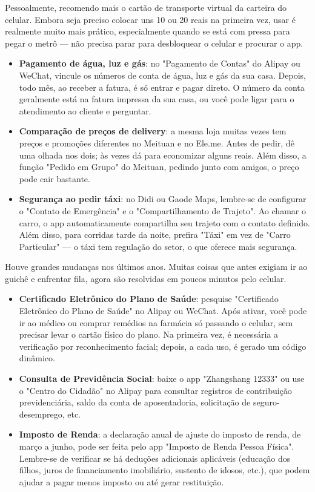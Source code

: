 Pessoalmente, recomendo mais o cartão de transporte virtual da carteira do celular. Embora seja preciso colocar uns 10 ou 20 reais na primeira vez, usar é realmente muito mais prático, especialmente quando se está com pressa para pegar o metrô — não precisa parar para desbloquear o celular e procurar o app.


\begin{itemize}
  \item \textbf{Pagamento de água, luz e gás}: no "Pagamento de Contas" do Alipay ou WeChat, vincule os números de conta de água, luz e gás da sua casa. Depois, todo mês, ao receber a fatura, é só entrar e pagar direto. O número da conta geralmente está na fatura impressa da sua casa, ou você pode ligar para o atendimento ao cliente e perguntar.
  \item \textbf{Comparação de preços de delivery}: a mesma loja muitas vezes tem preços e promoções diferentes no Meituan e no Ele.me. Antes de pedir, dê uma olhada nos dois; às vezes dá para economizar alguns reais. Além disso, a função "Pedido em Grupo" do Meituan, pedindo junto com amigos, o preço pode cair bastante.
  \item \textbf{Segurança ao pedir táxi}: no Didi ou Gaode Maps, lembre-se de configurar o "Contato de Emergência" e o "Compartilhamento de Trajeto". Ao chamar o carro, o app automaticamente compartilha seu trajeto com o contato definido. Além disso, para corridas tarde da noite, prefira "Táxi" em vez de "Carro Particular" — o táxi tem regulação do setor, o que oferece mais segurança.
\end{itemize}


Houve grandes mudanças nos últimos anos. Muitas coisas que antes exigiam ir ao guichê e enfrentar fila, agora são resolvidas em poucos minutos pelo celular.

\begin{itemize}
  \item \textbf{Certificado Eletrônico do Plano de Saúde}: pesquise "Certificado Eletrônico do Plano de Saúde" no Alipay ou WeChat. Após ativar, você pode ir ao médico ou comprar remédios na farmácia só passando o celular, sem precisar levar o cartão físico do plano. Na primeira vez, é necessária a verificação por reconhecimento facial; depois, a cada uso, é gerado um código dinâmico.
  \item \textbf{Consulta de Previdência Social}: baixe o app "Zhangshang 12333" ou use o "Centro do Cidadão" no Alipay para consultar registros de contribuição previdenciária, saldo da conta de aposentadoria, solicitação de seguro-desemprego, etc.
  \item \textbf{Imposto de Renda}: a declaração anual de ajuste do imposto de renda, de março a junho, pode ser feita pelo app "Imposto de Renda Pessoa Física". Lembre-se de verificar se há deduções adicionais aplicáveis (educação dos filhos, juros de financiamento imobiliário, sustento de idosos, etc.), que podem ajudar a pagar menos imposto ou até gerar restituição.
\end{itemize}

